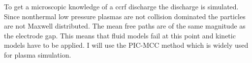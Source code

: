 To get a microscopic knowledge of a ccrf discharge the discharge is simulated.
Since nonthermal low pressure plasmas are not collision dominated the particles are not Maxwell distributed.
The mean free paths are of the same magnitude as the electrode gap.
This means that fluid models fail at this point and kinetic models have to be applied.
I will use the PIC-MCC method which is widely used for plasma simulation.


